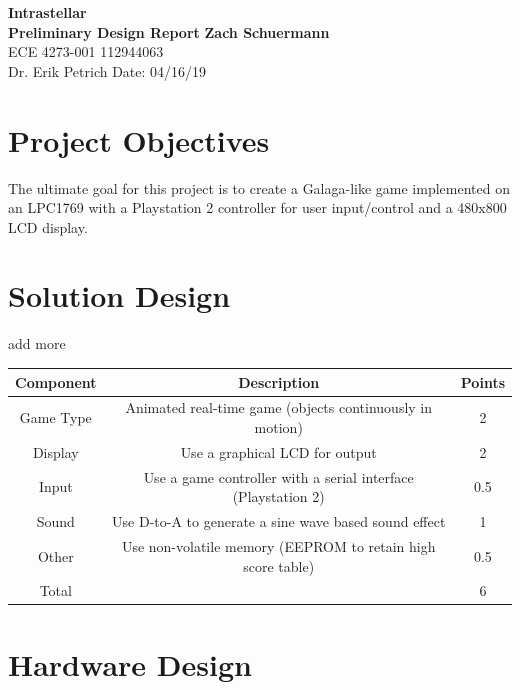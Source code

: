 \documentclass[a4paper, 12pt]{article}
\begin{document}
\noindent
\LARGE\textbf{Intrastellar} \hfill \\
\newline
\large\textbf{Preliminary Design Report} \hfill \textbf{Zach Schuermann} \\
\normalsize ECE 4273-001 \hfill 112944063 \\
Dr. Erik Petrich \hfill Date: 04/16/19 

\section*{Project Objectives}
The ultimate goal for this project is to create a Galaga-like game implemented on an LPC1769 with a Playstation 2 controller for user input/control and a 480x800 LCD display.

\section*{Solution Design}
add more

\begin{center}
  \begin{tabular}{ |c|c|c| }
    \hline
    \textbf{Component} & \textbf{Description} & \textbf{Points} \\
    \hline
    \hline
    Game Type & Animated real-time game (objects continuously in motion) & 2 \\
    \hline
    Display & Use a graphical LCD for output  & 2 \\
    \hline
    Input & Use a game controller with a serial interface (Playstation 2) & 0.5 \\ 
    \hline
    Sound & Use D-to-A to generate a sine wave based sound effect  & 1 \\
    \hline
    Other & Use non-volatile memory (EEPROM  to retain high score table) & 0.5 \\ 
    \hline
    Total & & 6 \\ 
    \hline
  \end{tabular}
\end{center}

\section*{Hardware Design}
\end{document}
